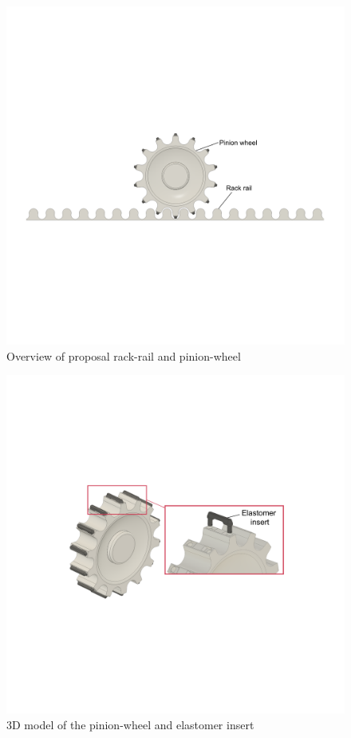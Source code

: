 \begin{figure}[tb]
  \centering
  \includegraphics[width=\columnwidth]{./figure/rack-pinion.pdf}
  \caption{Overview of proposal rack-rail and pinion-wheel}
  \label{fig:rack-pinion-concept}
\end{figure}


\begin{figure}[tb]
  \centering
  \includegraphics[width=.8\columnwidth]{figure/elastomer-insert.pdf}
  \caption{3D model of the pinion-wheel and elastomer insert}
  \label{fig:pinion-wheel-edited}
\end{figure}


